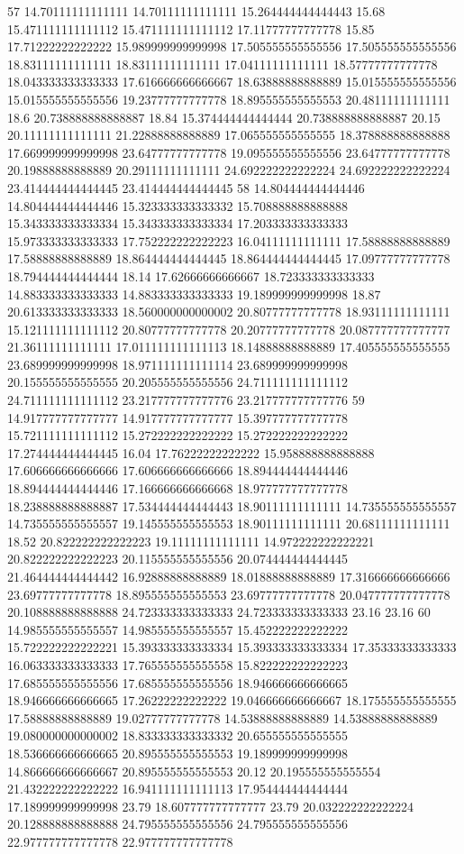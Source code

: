 57 14.70111111111111 14.70111111111111 15.264444444444443 15.68 15.471111111111112 15.471111111111112 17.11777777777778 15.85 17.71222222222222 15.989999999999998 17.505555555555556 17.505555555555556 18.83111111111111 18.83111111111111 17.04111111111111 18.57777777777778 18.043333333333333 17.616666666666667 18.63888888888889 15.015555555555556 15.015555555555556 19.23777777777778 18.895555555555553 20.48111111111111 18.6 20.738888888888887 18.84 15.374444444444444 20.738888888888887 20.15 20.11111111111111 21.22888888888889 17.065555555555555 18.378888888888888 17.669999999999998 23.64777777777778 19.095555555555556 23.64777777777778 20.19888888888889 20.29111111111111 24.692222222222224 24.692222222222224 23.414444444444445 23.414444444444445
58 14.804444444444446 14.804444444444446 15.323333333333332 15.708888888888888 15.343333333333334 15.343333333333334 17.203333333333333 15.973333333333333 17.752222222222223 16.04111111111111 17.58888888888889 17.58888888888889 18.864444444444445 18.864444444444445 17.09777777777778 18.794444444444444 18.14 17.62666666666667 18.723333333333333 14.883333333333333 14.883333333333333 19.189999999999998 18.87 20.613333333333333 18.560000000000002 20.80777777777778 18.93111111111111 15.121111111111112 20.80777777777778 20.20777777777778 20.087777777777777 21.36111111111111 17.011111111111113 18.14888888888889 17.405555555555555 23.689999999999998 18.971111111111114 23.689999999999998 20.155555555555555 20.205555555555556 24.711111111111112 24.711111111111112 23.217777777777776 23.217777777777776
59 14.917777777777777 14.917777777777777 15.397777777777778 15.721111111111112 15.272222222222222 15.272222222222222 17.274444444444445 16.04 17.76222222222222 15.958888888888888 17.606666666666666 17.606666666666666 18.894444444444446 18.894444444444446 17.166666666666668 18.977777777777778 18.238888888888887 17.534444444444443 18.90111111111111 14.735555555555557 14.735555555555557 19.145555555555553 18.90111111111111 20.68111111111111 18.52 20.822222222222223 19.11111111111111 14.972222222222221 20.822222222222223 20.115555555555556 20.074444444444445 21.464444444444442 16.92888888888889 18.01888888888889 17.316666666666666 23.69777777777778 18.895555555555553 23.69777777777778 20.047777777777778 20.108888888888888 24.723333333333333 24.723333333333333 23.16 23.16
60 14.985555555555557 14.985555555555557 15.452222222222222 15.722222222222221 15.393333333333334 15.393333333333334 17.35333333333333 16.063333333333333 17.765555555555558 15.822222222222223 17.685555555555556 17.685555555555556 18.946666666666665 18.946666666666665 17.26222222222222 19.046666666666667 18.175555555555555 17.58888888888889 19.02777777777778 14.53888888888889 14.53888888888889 19.080000000000002 18.833333333333332 20.655555555555555 18.536666666666665 20.895555555555553 19.189999999999998 14.866666666666667 20.895555555555553 20.12 20.195555555555554 21.432222222222222 16.941111111111113 17.954444444444444 17.189999999999998 23.79 18.607777777777777 23.79 20.032222222222224 20.128888888888888 24.795555555555556 24.795555555555556 22.977777777777778 22.977777777777778
